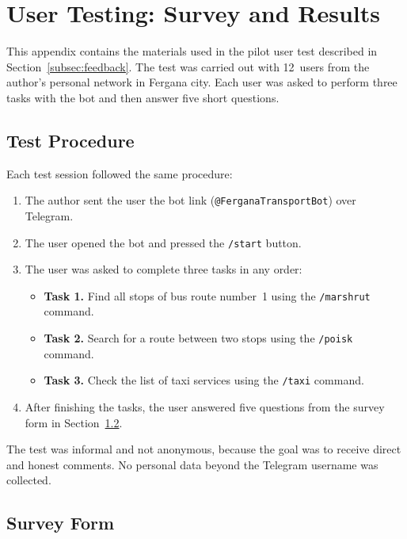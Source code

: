 \chapter{User Testing: Survey and Results}
\label{app:survey}

This appendix contains the materials used in the pilot user test described
in Section~\ref{subsec:feedback}. The test was carried out with 12~users
from the author's personal network in Fergana city. Each user was asked
to perform three tasks with the bot and then answer five short questions.

\section{Test Procedure}
\label{app:procedure}

Each test session followed the same procedure:

\begin{enumerate}
    \item The author sent the user the bot link
        (\texttt{@FerganaTransportBot}) over Telegram.
    \item The user opened the bot and pressed the \texttt{/start} button.
    \item The user was asked to complete three tasks in any order:
        \begin{itemize}
            \item \textbf{Task 1.} Find all stops of bus route number~1
                using the \texttt{/marshrut} command.
            \item \textbf{Task 2.} Search for a route between two stops
                using the \texttt{/poisk} command.
            \item \textbf{Task 3.} Check the list of taxi services using
                the \texttt{/taxi} command.
        \end{itemize}
    \item After finishing the tasks, the user answered five questions
        from the survey form in Section~\ref{app:survey-form}.
\end{enumerate}

The test was informal and not anonymous, because the goal was to receive
direct and honest comments. No personal data beyond the Telegram username
was collected.

\section{Survey Form}
\label{app:survey-form}

